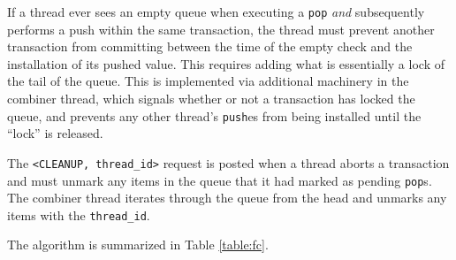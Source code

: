 If a thread ever sees an empty queue when executing a \texttt{pop} \emph{and} subsequently performs a push within the same transaction, the thread must prevent another transaction from committing between the time of the empty check and the installation of its pushed value. This requires adding what is essentially a lock of the tail of the queue. This is implemented via additional machinery in the combiner thread, which signals whether or not a transaction has locked the queue, and prevents any other thread's \texttt{push}es from being installed until the ``lock'' is released.

The \texttt{<CLEANUP, thread\_id>} request is posted when a thread aborts a transaction and must unmark any items in the queue that it had marked as pending \texttt{pop}s. The combiner thread iterates through the queue from the head and unmarks any items with the \texttt{thread\_id}.

The algorithm is summarized in Table \ref{table:fc}.



